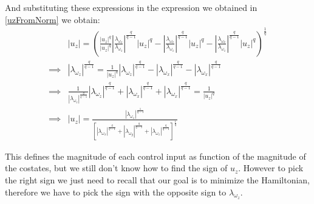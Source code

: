 And substituting these expressions in the expression we obtained in \ref{uzFromNorm} we obtain:
\begin{align}
& |u_z| = 
\left(
\frac{|u_z|^q}{|u_z|^q} \left|\frac{\lambda_{\omega_{z}}}{\lambda_{\omega_z}}\right|^{\frac{q}{q-1}}
|u_z|^q- \left|\frac{\lambda_{\omega_{x}}}{\lambda_{\omega_z}}\right|^{\frac{q}{q-1}}
|u_z|^q - \left|\frac{\lambda_{\omega_{x}}}{\lambda_{\omega_z}}\right|^{\frac{q}{q-1}}
|u_z|^q
\right)^{\frac{1}{q}} \\
\implies & 
|\lambda_{\omega_z}|^{\frac{q}{q-1}} = 
\frac{1}{|u_z|^q} |\lambda_{\omega_{z}}|^{\frac{q}{q-1}}
- |\lambda_{\omega_{x}}|^{\frac{q}{q-1}}
- |\lambda_{\omega_{x}}|^{\frac{q}{q-1}}
\\ \implies &
\frac{1}{|\lambda_{\omega_{z}}|^{\frac{q}{q-1}}}
|\lambda_{\omega_z}|^{\frac{q}{q-1}} + |\lambda_{\omega_{x}}|^{\frac{q}{q-1}}
+ |\lambda_{\omega_{x}}|^{\frac{q}{q-1}} = 
\frac{1}{|u_z|^q}
\\ \implies &
|u_z| = 
\frac{|\lambda_{\omega_{z}}|^{\frac{1}{q-1}}}
{\left[ |\lambda_{\omega_x}|^{\frac{q}{q-1}} + |\lambda_{\omega_y}|^{\frac{q}{q-1}} + |\lambda_{\omega_z}|^{\frac{q}{q-1}}\right]^\frac{1}{q}}
\end{align}

This defines the magnitude of each control input as function of the magnitude of the costates, but we still don't know how to find the sign of $u_z$. However to pick the right sign we just need to recall that our goal is to minimize the Hamiltonian, therefore we have to pick the sign with the opposite sign to $\lambda_{\omega_z}$. 

\iffalse
In order to find it we make use of the Legendre-Clebsch condition on the unconstrained version of the problem we found on \ref{unconstrainedOptimalControl}. In \ref{partialLx}, \ref{partialLy} we found the first derivatives, in order to verify the Legendre-condition we take the second derivatives:
\begin{align}
\frac{\partial^2 \mathcal{L}}{{\partial u_x}^2} &=
-\text{sgn}(u_z) \ \lambda_{\omega_z} \ \left( -(1 - |u_x|^q - |u_y|^q)^{\frac{1-2q}{q}} |u_x|^{2q-2} + \ (1 - |u_x|^q - |u_y|^q)^{\frac{1-q}{q}} |u_x|^{q-2} \right) \\
&= -\text{sgn}(u_z) \ \lambda_{\omega_z} \ \left(-|u_z|^{1-2q} |u_x|^{2q-2} + |u_z|^{1-q} |u_x|^{q-2} \right) \nonumber
\\
\frac{\partial^2 \mathcal{L}}{{\partial u_y}^2} &= 
-\text{sgn}(u_z) \ \lambda_{\omega_z} \ \left( -(1 - |u_x|^q - |u_y|^q)^{\frac{1-2q}{q}} |u_y|^{2q-2} + \ (1 - |u_x|^q - |u_y|^q)^{\frac{1-q}{q}} |u_y|^{q-2} \right) \\
&= -\text{sgn}(u_z) \ \lambda_{\omega_z} \ \left(-|u_z|^{1-2q} |u_y|^{2q-2} + |u_z|^{1-q} |u_y|^{q-2} \right) \nonumber
\\
\frac{\partial^2 \mathcal{L}}{{\partial u_y}^2} &= 
\text{sgn}(u_z u_x u_y) \ \lambda_{\omega_z} \ \left( (1 - |u_x|^q - |u_y|^q)^{\frac{1-2q}{q}} |u_y|^{q-1} |u_x|^{q-1} \right) \\
&= \text{sgn}(u_z u_x u_y) \ \lambda_{\omega_z} \ |u_z|^{1-2q} |u_y|^{q-1} |u_x|^{q-1}
\end{align}
\fi

